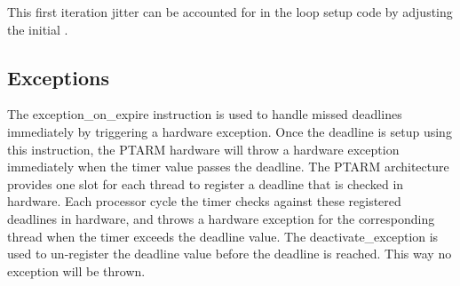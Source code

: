 This first iteration jitter can be accounted for in the loop setup code by adjusting the initial \deadlinet. 

 


\subsection{Exceptions}
The exception\_on\_expire instruction is used to handle missed deadlines immediately by triggering a hardware exception. 
Once the deadline is setup using this instruction, the PTARM hardware will throw a hardware exception immediately when the timer value passes the deadline.
The PTARM architecture provides one slot for each thread to register a deadline that is checked in hardware.
Each processor cycle the timer checks against these registered deadlines in hardware, and throws a hardware exception for the corresponding thread when the timer exceeds the deadline value. 
The deactivate\_exception is used to un-register the deadline value before the deadline is reached. 
This way no exception will be thrown.

